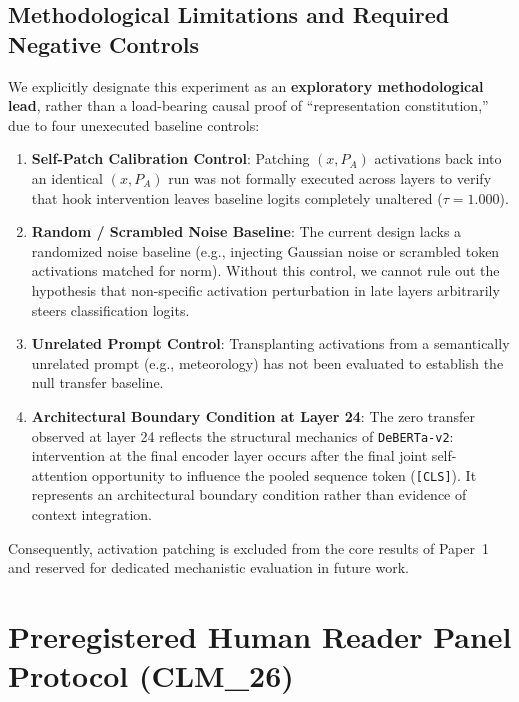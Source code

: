 \subsection{Methodological Limitations and Required Negative Controls}
We explicitly designate this experiment as an \textbf{exploratory methodological lead}, rather than a load-bearing causal proof of ``representation constitution,'' due to four unexecuted baseline controls:
\begin{enumerate}
    \item \textbf{Self-Patch Calibration Control}: Patching $(x, P_A)$ activations back into an identical $(x, P_A)$ run was not formally executed across layers to verify that hook intervention leaves baseline logits completely unaltered ($\tau = 1.000$).
    \item \textbf{Random / Scrambled Noise Baseline}: The current design lacks a randomized noise baseline (e.g., injecting Gaussian noise or scrambled token activations matched for norm). Without this control, we cannot rule out the hypothesis that non-specific activation perturbation in late layers arbitrarily steers classification logits.
    \item \textbf{Unrelated Prompt Control}: Transplanting activations from a semantically unrelated prompt (e.g., meteorology) has not been evaluated to establish the null transfer baseline.
    \item \textbf{Architectural Boundary Condition at Layer 24}: The zero transfer observed at layer 24 reflects the structural mechanics of \texttt{DeBERTa-v2}: intervention at the final encoder layer occurs after the final joint self-attention opportunity to influence the pooled sequence token (\texttt{[CLS]}). It represents an architectural boundary condition rather than evidence of context integration.
\end{enumerate}
Consequently, activation patching is excluded from the core results of Paper~1 and reserved for dedicated mechanistic evaluation in future work.

\newpage

\section{Preregistered Human Reader Panel Protocol (CLM\_26)}
\label{app:human_protocol}

\begin{center}
\end{center}

